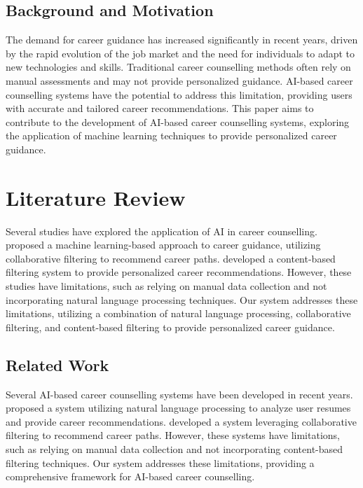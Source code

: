 \documentclass[12pt,a4paper]{article}
\begin{document}
\subsection{Background and Motivation}
The demand for career guidance has increased significantly in recent years, driven by the rapid evolution of the job market and the need for individuals to adapt to new technologies and skills. Traditional career counselling methods often rely on manual assessments and may not provide personalized guidance. AI-based career counselling systems have the potential to address this limitation, providing users with accurate and tailored career recommendations. This paper aims to contribute to the development of AI-based career counselling systems, exploring the application of machine learning techniques to provide personalized career guidance.

\section{Literature Review}
Several studies have explored the application of AI in career counselling. \citet{Kumar2019} proposed a machine learning-based approach to career guidance, utilizing collaborative filtering to recommend career paths. \citet{Sharma2020} developed a content-based filtering system to provide personalized career recommendations. However, these studies have limitations, such as relying on manual data collection and not incorporating natural language processing techniques. Our system addresses these limitations, utilizing a combination of natural language processing, collaborative filtering, and content-based filtering to provide personalized career guidance.

\subsection{Related Work}
Several AI-based career counselling systems have been developed in recent years. \citet{Gupta2018} proposed a system utilizing natural language processing to analyze user resumes and provide career recommendations. \citet{Mehta2020} developed a system leveraging collaborative filtering to recommend career paths. However, these systems have limitations, such as relying on manual data collection and not incorporating content-based filtering techniques. Our system addresses these limitations, providing a comprehensive framework for AI-based career counselling.
\end{document}
